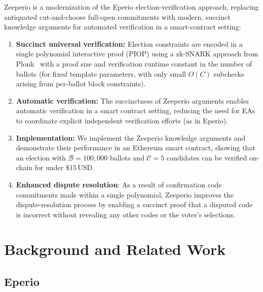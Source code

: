 Zeeperio is a modernization of the Eperio election-verification approach, replacing antiquated cut-and-choose full-open commitments with modern, succinct knowledge arguments for automated verification in a smart-contract setting:

\begin{enumerate}
 	\item \textbf{Succinct universal verification:} Election constraints are encoded in a single polynomial interactive proof (PIOP) using a zk-SNARK approach from Plonk~\cite{GWC19} with a proof size and verification runtime constant in the number of ballots (for fixed template parameters, with only small $O(C)$ subchecks arising from per-ballot block constraints).
 	\item \textbf{Automatic verification:} The succinctness of Zeeperio arguments enables automatic verification in a smart contract setting, reducing the need for EAs to coordinate explicit independent verification efforts (as in Eperio).
 	\item \textbf{Implementation:} We implement the Zeeperio knowledge arguments and demonstrate their performance in an Ethereum smart contract, showing that an election with $\mathcal{B}=100{,}000$ ballots and $\mathcal{C}=5$ candidates can be verified on-chain for under $\$15\,$USD.
 	\item \textbf{Enhanced dispute resolution}: As a result of confirmation code commitments made within a single polynomial, Zeeperio improves the dispute-resolution process by enabling a succinct proof that a disputed code is incorrect without revealing any other codes or the voter’s selections.
 \end{enumerate}

\section{Background and Related Work}

\subsection{Eperio}

